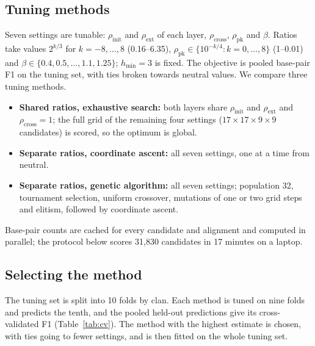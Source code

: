 \documentclass[10pt, twocolumn]{article}
\newcommand{\rinit}{\rho_{\mathrm{init}}}
\newcommand{\rext}{\rho_{\mathrm{ext}}}
\newcommand{\rcross}{\rho_{\mathrm{cross}}}
\newcommand{\rpk}{\rho_{\mathrm{pk}}}
\newcommand{\hmin}{h_{\min}}
\begin{document}
\subsection{Tuning methods}
Seven settings are tunable: $\rinit$ and $\rext$ of each layer, $\rcross$, $\rpk$ and $\beta$. Ratios take values $2^{k/3}$ for $k=-8,\dots,8$ (0.16--6.35), $\rpk\in\{10^{-k/4}: k=0,\dots,8\}$ (1--0.01) and $\beta\in\{0.4,0.5,\dots,1.1,1.25\}$; $\hmin=3$ is fixed. The objective is pooled base-pair F1 on the tuning set, with ties broken towards neutral values. We compare three tuning methods.
\begin{itemize}
    \item \textbf{Shared ratios, exhaustive search:} both layers share $\rinit$ and $\rext$ and $\rcross=1$; the full grid of the remaining four settings ($17\times17\times9\times9$ candidates) is scored, so the optimum is global.
    \item \textbf{Separate ratios, coordinate ascent:} all seven settings, one at a time from neutral.
    \item \textbf{Separate ratios, genetic algorithm:} all seven settings; population 32, tournament selection, uniform crossover, mutations of one or two grid steps and elitism, followed by coordinate ascent.
\end{itemize}
Base-pair counts are cached for every candidate and alignment and computed in parallel; the protocol below scores 31{,}830 candidates in 17 minutes on a laptop.

\subsection{Selecting the method}
The tuning set is split into 10 folds by clan. Each method is tuned on nine folds and predicts the tenth, and the pooled held-out predictions give its cross-validated F1 (Table~\ref{tab:cv}). The method with the highest estimate is chosen, with ties going to fewer settings, and is then fitted on the whole tuning set.
\end{document}
